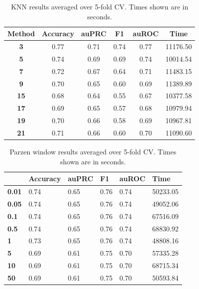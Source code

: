 \documentclass[12pt]{article}
\begin{document}
    
    \begin{table}[]
    \centering
\begin{tabular}{|c|c|c|c|c|c|}
\hline
\textbf{Method} & \textbf{Accuracy} & \textbf{auPRC} & \textbf{F1} & \textbf{auROC} & \textbf{Time} \\ \hline
\textbf{3}  & 0.77 & 0.71 & 0.74 & 0.77 & 11176.50 \\ \hline
\textbf{5}  & 0.74 & 0.69 & 0.69 & 0.74 & 10014.54 \\ \hline
\textbf{7}  & 0.72 & 0.67 & 0.64 & 0.71 & 11483.15 \\ \hline
\textbf{9}  & 0.70 & 0.65 & 0.60 & 0.69 & 11389.89 \\ \hline
\textbf{15} & 0.68 & 0.64 & 0.55 & 0.67 & 10377.58 \\ \hline
\textbf{17} & 0.69 & 0.65 & 0.57 & 0.68 & 10979.94 \\ \hline
\textbf{19} & 0.70 & 0.66 & 0.58 & 0.69 & 10967.81 \\ \hline
\textbf{21} & 0.71 & 0.66 & 0.60 & 0.70 & 11090.60 \\ \hline
\end{tabular}
\caption{KNN results averaged over 5-fold CV. Times shown are in seconds.}
\label{table:3}
\end{table}
    
    \begin{table}[]
    \centering
\begin{tabular}{|l|l|l|l|l|l|}
\hline
              & \textbf{Accuracy} & \textbf{auPRC} & \textbf{F1} & \textbf{auROC} & \textbf{Time} \\ \hline
\textbf{0.01} & 0.74              & 0.65           & 0.76        & 0.74           & 50233.05      \\ \hline
\textbf{0.05} & 0.74              & 0.65           & 0.76        & 0.74           & 49052.06      \\ \hline
\textbf{0.1}  & 0.74              & 0.65           & 0.76        & 0.74           & 67516.09      \\ \hline
\textbf{0.5}  & 0.74              & 0.65           & 0.76        & 0.74           & 68830.92      \\ \hline
\textbf{1}    & 0.73              & 0.65           & 0.76        & 0.74           & 48808.16      \\ \hline
\textbf{5}    & 0.69              & 0.61           & 0.75        & 0.70           & 57335.28      \\ \hline
\textbf{10}   & 0.69              & 0.61           & 0.75        & 0.70           & 68715.34      \\ \hline
\textbf{50}   & 0.69              & 0.61           & 0.75        & 0.70           & 50593.84      \\ \hline
\end{tabular}
\caption{Parzen window results averaged over 5-fold CV. Times shown are in seconds.}
\label{table:4}
\end{table}
    
\end{document}
